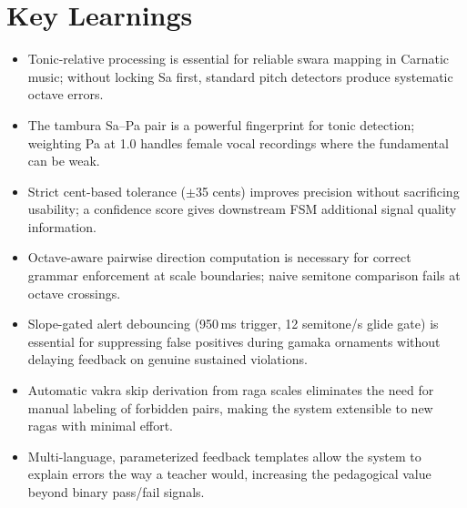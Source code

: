 \documentclass[12pt,a4paper]{report}
\numberwithin{equation}{chapter}
\begin{document}
\section{Key Learnings}
\begin{itemize}
    \item Tonic-relative processing is essential for reliable swara mapping in Carnatic music; without locking Sa first, standard pitch detectors produce systematic octave errors.
    \item The tambura Sa--Pa pair is a powerful fingerprint for tonic detection; weighting Pa at 1.0 handles female vocal recordings where the fundamental can be weak.
    \item Strict cent-based tolerance ($\pm$35 cents) improves precision without sacrificing usability; a confidence score gives downstream FSM additional signal quality information.
    \item Octave-aware pairwise direction computation is necessary for correct grammar enforcement at scale boundaries; naive semitone comparison fails at octave crossings.
    \item Slope-gated alert debouncing (950\,ms trigger, 12 semitone/s glide gate) is essential for suppressing false positives during gamaka ornaments without delaying feedback on genuine sustained violations.
    \item Automatic vakra skip derivation from raga scales eliminates the need for manual labeling of forbidden pairs, making the system extensible to new ragas with minimal effort.
    \item Multi-language, parameterized feedback templates allow the system to explain errors the way a teacher would, increasing the pedagogical value beyond binary pass/fail signals.
\end{itemize}
\end{document}
